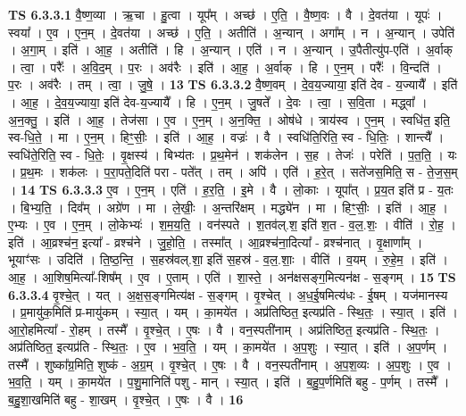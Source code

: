 \documentclass[17pt]{extarticle}
\begin{document}
                                \textbf{ TS 6.3.3.1} \newline
                  वै॒ष्ण॒व्या । ऋ॒चा । हु॒त्वा । यूप᳚म् । अच्छ॑ । ए॒ति॒ । वै॒ष्ण॒वः । वै । दे॒वत॑या । यूपः॑ । स्वया᳚ । ए॒व । ए॒न॒म् । दे॒वत॑या । अच्छ॑ । ए॒ति॒ । अतीति॑ । अ॒न्यान् । अगा᳚म् । न । अ॒न्यान् । उपेति॑ । अ॒गा॒म् । इति॑ । आ॒ह॒ । अतीति॑ । हि । अ॒न्यान् । एति॑ । न । अ॒न्यान् । उ॒पैतीत्यु॑प-एति॑ । अ॒र्वाक् । त्वा॒ । परैः᳚ । अ॒वि॒द॒म् । प॒रः । अव॑रैः । इति॑ । आ॒ह॒ । अ॒र्वाक् । हि । ए॒न॒म् । परैः᳚ । वि॒न्दति॑ । प॒रः । अव॑रैः । तम् । त्वा॒ । जु॒षे॒ । \textbf{  13} \newline
                  \newline
                                \textbf{ TS 6.3.3.2} \newline
                  वै॒ष्ण॒वम् । दे॒व॒य॒ज्याया॒ इति॑ देव - य॒ज्यायै᳚ । इति॑ । आ॒ह॒ । दे॒व॒य॒ज्याया॒ इति॑ देव-य॒ज्यायै᳚ । हि । ए॒न॒म् । जु॒षते᳚ । दे॒वः । त्वा॒ । स॒वि॒ता । मद्ध्वा᳚ । अ॒न॒क्तु॒ । इति॑ । आ॒ह॒ । तेज॑सा । ए॒व । ए॒न॒म् । अ॒न॒क्ति॒ । ओष॑धे । त्राय॑स्व । ए॒न॒म् । स्वधि॑त॒ इति॒ स्व-धि॒ते॒ । मा । ए॒न॒म् । हिꣳ॒॒सीः॒ । इति॑ । आ॒ह॒ । वज्रः॑ । वै । स्वधि॑ति॒रिति॒ स्व - धि॒तिः॒ । शान्त्यै᳚ । स्वधि॑ते॒रिति॒ स्व - धि॒तेः॒ । वृ॒क्षस्य॑ । बिभ्य॑तः । प्र॒थ॒मेन॑ । शक॑लेन । स॒ह । तेजः॑ । परेति॑ । प॒त॒ति॒ । यः । प्र॒थ॒मः । शक॑लः । प॒रा॒पते॒दिति॑ परा - पते᳚त् । तम् । अपि॑ । एति॑ । ह॒रे॒त् । सते॑जस॒मिति॒ स - ते॒ज॒स॒म् । \textbf{  14} \newline
                  \newline
                                \textbf{ TS 6.3.3.3} \newline
                  ए॒व । ए॒न॒म् । एति॑ । ह॒र॒ति॒ । इ॒मे । वै । लो॒काः । यूपा᳚त् । प्र॒य॒त इति॑ प्र - य॒तः । बि॒भ्य॒ति॒ । दिव᳚म् । अग्रे॑ण । मा । ले॒खीः॒ । अ॒न्तरि॑क्षम् । मद्ध्ये॑न । मा । हिꣳ॒॒सीः॒ । इति॑ । आ॒ह॒ । ए॒भ्यः । ए॒व । ए॒न॒म् । लो॒केभ्यः॑ । श॒म॒य॒ति॒ । वन॑स्पते । श॒तव॑ल्.श॒ इति॑ श॒त - व॒ल॒.शः॒ । वीति॑ । रो॒ह॒ । इति॑ । आ॒व्रश्च॑न॒ इत्या᳚ - व्रश्च॑ने । जु॒हो॒ति॒ । तस्मा᳚त् । आ॒व्रश्च॑ना॒दित्या᳚ - व्रश्च॑नात् । वृ॒क्षाणा᳚म् । भूयाꣳ॑सः । उदिति॑ । ति॒ष्ठ॒न्ति॒ । स॒हस्र॑वल्.शा॒ इति॑ स॒हस्र॑ - व॒ल॒.शाः॒ । वीति॑ । व॒यम् । रु॒हे॒म॒ । इति॑ । आ॒ह॒ । आ॒शिष॒मित्या᳚-शिष᳚म् । ए॒व । ए॒ताम् । एति॑ । शा॒स्ते॒ । अन॑क्षसङ्ग॒मित्यन॑क्ष - स॒ङ्गम् । \textbf{  15} \newline
                  \newline
                                \textbf{ TS 6.3.3.4} \newline
                  वृ॒श्चे॒त् । यत् । अ॒क्ष॒स॒ङ्गमित्य॑क्ष - स॒ङ्गम् । वृ॒श्चेत् । अ॒ध॒ई॒षमित्य॑धः - ई॒षम् । यज॑मानस्य । प्र॒मायु॑क॒मिति॑ प्र-मायु॑कम् । स्या॒त् । यम् । का॒मये॑त । अप्र॑तिष्ठित॒ इत्यप्र॑ति - स्थि॒तः॒ । स्या॒त् । इति॑ । आ॒रो॒हमित्या᳚ - रो॒हम् । तस्मै᳚ । वृ॒श्चे॒त् । ए॒षः । वै । वन॒स्पती॑नाम् । अप्र॑तिष्ठित॒ इत्यप्र॑ति - स्थि॒तः॒ । अप्र॑तिष्ठित॒ इत्यप्र॑ति - स्थि॒तः॒ । ए॒व । भ॒व॒ति॒ । यम् । का॒मये॑त । अ॒प॒शुः । स्या॒त् । इति॑ । अ॒प॒र्णम् । तस्मै᳚ । शुष्का᳚ग्र॒मिति॒ शुष्क॑ - अ॒ग्र॒म् । वृ॒श्चे॒त् । ए॒षः । वै । वन॒स्पती॑नाम् । अ॒प॒श॒व्यः । अ॒प॒शुः । ए॒व । भ॒व॒ति॒ । यम् । का॒मये॑त । प॒शु॒मानिति॑ पशु - मान् । स्या॒त् । इति॑ । ब॒हु॒प॒र्णमिति॑ बहु - प॒र्णम् । तस्मै᳚ । ब॒हु॒शा॒खमिति॑ बहु - शा॒खम् । वृ॒श्चे॒त् । ए॒षः । वै । \textbf{  16} \newline
\end{document}
